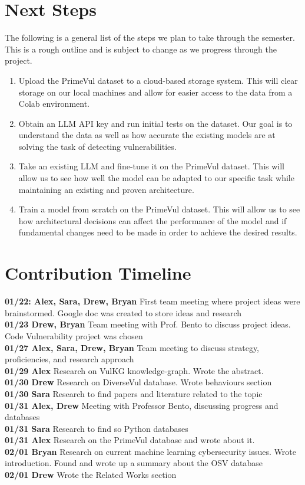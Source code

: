 \documentclass{article}
\begin{document}
\section{Next Steps}
The following is a general list of the steps we plan to take through the semester.
This is a rough outline and is subject to change as we progress through the project.

\begin{enumerate}
  \item Upload the PrimeVul dataset to a cloud-based storage system. This will clear 
    storage on our local machines and allow for 
    easier access to the data from a Colab environment.
  \item Obtain an LLM API key and run initial tests on the dataset. Our goal is to 
    understand the data as well as how accurate the existing models are at solving
    the task of detecting vulnerabilities.
  \item Take an existing LLM and fine-tune it on the PrimeVul dataset. This will allow
    us to see how well the model can be adapted to our specific task while maintaining
    an existing and proven architecture.
  \item Train a model from scratch on the PrimeVul dataset. This will allow us to see
    how architectural decisions can affect the performance of the model and if fundamental
    changes need to be made in order to achieve the desired results.
\end{enumerate}

\section{Contribution Timeline}
\textbf{01/22: Alex, Sara, Drew, Bryan} First team meeting where project ideas were
brainstormed. Google doc was created to store ideas and research \\
\textbf{01/23 Drew, Bryan} Team meeting with Prof. Bento to discuss project ideas.
Code Vulnerability project was chosen \\
\textbf{01/27 Alex, Sara, Drew, Bryan} Team meeting to discuss strategy, proficiencies, 
and research approach \\
\textbf{01/29 Alex} Research on VulKG knowledge-graph. Wrote the abstract. \\
\textbf{01/30 Drew} Research on DiverseVul database. Wrote behaviours section \\
\textbf{01/30 Sara} Research to find papers and literature related to the topic \\
\textbf{01/31 Alex, Drew} Meeting with Professor Bento, discussing progress and databases \\
\textbf{01/31 Sara} Research to find so Python databases \\
\textbf{01/31 Alex} Research on the PrimeVul database and wrote about it. \\
\textbf{02/01 Bryan} Research on current machine learning cybersecurity issues. Wrote
introduction. Found and wrote up a summary about the OSV database \\
\textbf{02/01 Drew} Wrote the Related Works section \\

      

\end{document}

